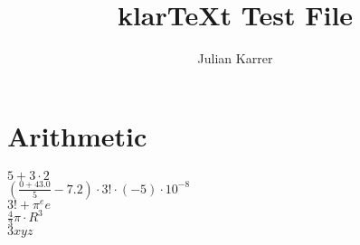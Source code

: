 \documentclass[oneside, a4paper]{article}
\author{Julian Karrer}
\title{klarTeXt Test File}
\begin{document}
\maketitle
\section*{Arithmetic}


\begin{program}

$5+3\cdot 2$\\
$\left(\frac{0+43.0}{5}-7.2\right)\cdot 3! \cdot (-5) \cdot 10^{-8}$\\
$3! + \pi^e e$\\
$\frac{4}{3}\pi \cdot R^3$\\
$3xyz$

\end{program}
\end{document}
